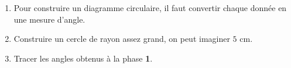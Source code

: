 \begin{pageCours}
\begin{Ex}
\end{Ex}


\begin{Mt}

\begin{enumerate}[leftmargin=*]
\item Pour construire un diagramme circulaire, il faut convertir chaque donnée en une mesure d'angle.
\item Construire un cercle de rayon assez grand, on peut imaginer $5$ cm.
\item Tracer les angles obtenus à la phase \textbf{1}. 
\end{enumerate}
 
\end{Mt}


\end{pageCours}


